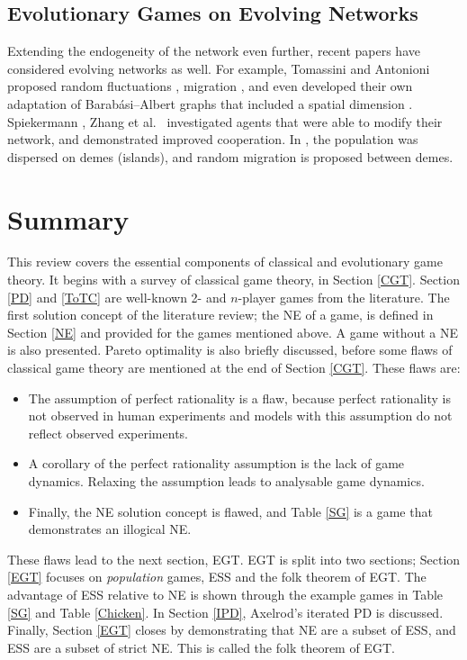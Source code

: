  \subsection{Evolutionary Games on Evolving Networks}
 Extending the endogeneity of the network even further, recent papers have considered evolving networks as well. For example, Tomassini and Antonioni proposed random fluctuations \cite{RN41,RN42}, migration \cite{RN50, RN62}, and even developed their own adaptation of Barab\'{a}si--Albert graphs that included a spatial dimension \cite{RN51}. Spiekermann \cite{RN68}, Zhang et al.~\cite{RN71} investigated agents that were able to modify their network, and demonstrated improved cooperation. In \cite{RN72}, the population was dispersed on demes (islands), and random migration is proposed between demes. \\
 
 






\section{Summary}
This review covers the essential components of classical and evolutionary game theory. It begins with a survey of classical game theory, in Section \ref{CGT}. Section \ref{PD} and \ref{ToTC} are well-known 2- and $n$-player games from the literature. The first solution concept of the literature review; the NE of a game, is defined in Section \ref{NE} and provided for the games mentioned above. A game without a NE is also presented. Pareto optimality is also briefly discussed, before some flaws of classical game theory are mentioned at the end of Section \ref{CGT}.  These flaws are:

\begin{itemize}
    \item The assumption of perfect rationality is a flaw, because perfect rationality is not observed in human experiments and models with this assumption do not reflect observed experiments. 
    \item A corollary of the perfect rationality assumption is the lack of game dynamics. Relaxing the assumption leads to analysable game dynamics.
    \item  Finally, the NE solution concept is flawed, and Table \ref{SG} is a game that demonstrates an illogical NE.
    
\end{itemize} 
These flaws lead to the next section, EGT. EGT is split into two sections; Section \ref{EGT} focuses on \emph{population} games, ESS and the folk theorem of EGT. The advantage of ESS relative to NE is shown through the example games in Table \ref{SG} and Table \ref{Chicken}. In Section \ref{IPD}, Axelrod's iterated PD is discussed. Finally, Section \ref{EGT} closes by demonstrating  that NE are a subset of ESS, and ESS are a subset of strict NE. This is called the folk theorem of EGT. \\

